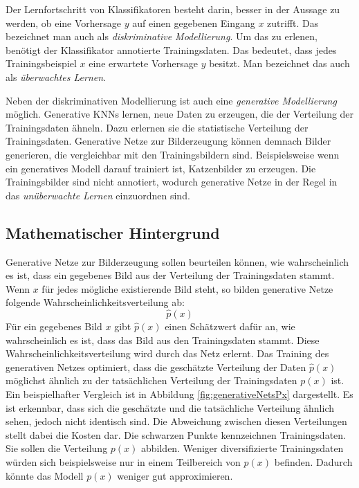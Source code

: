 \label{chap:NoGANs}

Der Lernfortschritt von Klassifikatoren besteht darin, besser in der Aussage zu werden, ob eine Vorhersage $y$ auf einen gegebenen Eingang $x$ zutrifft. Das bezeichnet man auch als \emph{diskriminative Modellierung}. Um das zu erlenen, benötigt der Klassifikator annotierte Trainingsdaten. Das bedeutet, dass jedes Trainingsbeispiel $x$ eine erwartete Vorhersage $y$ besitzt. Man bezeichnet das auch als \emph{überwachtes Lernen}. \cite{generative-modellierung}

Neben der diskriminativen Modellierung ist auch eine \emph{generative Modellierung} möglich. Generative \acp{KNN} lernen, neue Daten zu erzeugen, die der Verteilung der Trainingsdaten ähneln. Dazu erlernen sie die statistische Verteilung der Trainingsdaten. Generative Netze zur Bilderzeugung können demnach Bilder generieren, die vergleichbar mit den Trainingsbildern sind. Beispielsweise wenn ein generatives Modell darauf trainiert ist, Katzenbilder zu erzeugen. Die Trainingsbilder sind nicht annotiert, wodurch generative Netze in der Regel in das \emph{unüberwachte Lernen} einzuordnen sind. \cite{generative-modellierung}

\subsection{Mathematischer Hintergrund}
Generative Netze zur Bilderzeugung sollen beurteilen können, wie wahrscheinlich es ist, dass ein gegebenes Bild aus der Verteilung der Trainingsdaten stammt. Wenn $x$ für jedes mögliche existierende Bild steht, so bilden generative Netze folgende Wahrscheinlichkeitsverteilung ab: \cite{generative-modellierung}
\begin{equation}
   \hat{p}(x)
\end{equation}
Für ein gegebenes Bild $x$ gibt $\hat{p}(x)$ einen Schätzwert dafür an, wie wahrscheinlich es ist, dass das Bild aus den Trainingsdaten stammt. Diese Wahrscheinlichkeitsverteilung wird durch das Netz erlernt. Das Training des generativen Netzes optimiert, dass die geschätzte Verteilung der Daten $\hat{p}(x)$ möglichst ähnlich zu der tatsächlichen Verteilung der Trainingsdaten $p(x)$ ist. Ein beispielhafter Vergleich ist in Abbildung \ref{fig:generativeNetsPx} dargestellt. Es ist erkennbar, dass sich die geschätzte und die tatsächliche Verteilung ähnlich sehen, jedoch nicht identisch sind. Die Abweichung zwischen diesen Verteilungen stellt dabei die Kosten dar. Die schwarzen Punkte kennzeichnen Trainingsdaten. Sie sollen die Verteilung $p(x)$ abbilden. Weniger diversifizierte Trainingsdaten würden sich beispielsweise nur in einem Teilbereich von $p(x)$ befinden. Dadurch könnte das Modell $p(x)$ weniger gut approximieren. \cite{generative-modellierung} \cite{openAiGenerativeNets}

